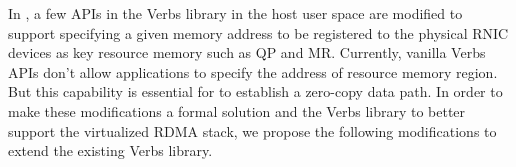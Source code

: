 



In \sys, a few APIs in the Verbs library in the host user space are modified to support specifying a given memory address to be registered to the physical RNIC devices as key resource memory such as QP and MR. Currently, vanilla Verbs APIs don't allow applications to specify the address of resource memory region. But this capability is essential for \sys to establish a zero-copy data path.
In order to make these modifications a formal solution and the Verbs library to better support the virtualized RDMA stack, we propose the following modifications to extend the existing Verbs library.


